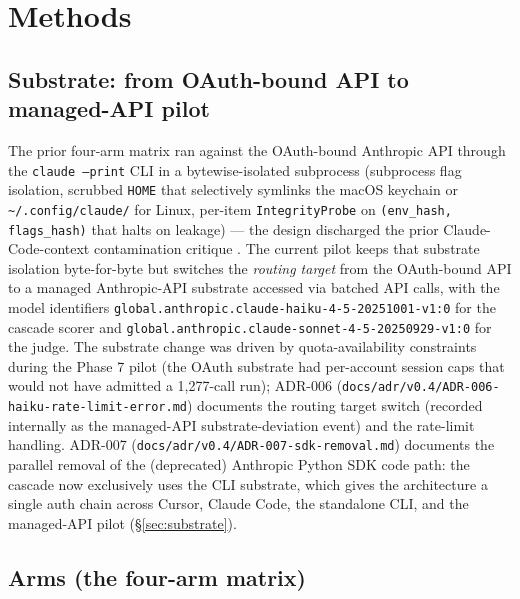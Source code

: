 \section{Methods}\label{sec:methods}

\sloppy

\subsection{Substrate: from OAuth-bound API to managed-API pilot}

The prior four-arm matrix ran against the OAuth-bound Anthropic API through the \texttt{claude --print} CLI in a bytewise-isolated subprocess (subprocess flag isolation, scrubbed \texttt{HOME} that selectively symlinks the macOS keychain or \texttt{\textasciitilde/.config/claude/} for Linux, per-item \texttt{IntegrityProbe} on \texttt{(env\_hash, flags\_hash)} that halts on leakage) --- the design discharged the prior Claude-Code-context contamination critique \citep{PratyakshaContextEng2025}. The current pilot keeps that substrate isolation byte-for-byte but switches the \emph{routing target} from the OAuth-bound API to a managed Anthropic-API substrate accessed via batched API calls, with the model identifiers \texttt{global.anthropic.claude-haiku-4-5-20251001-v1:0} for the cascade scorer and \texttt{global.anthropic.claude-sonnet-4-5-20250929-v1:0} for the judge. The substrate change was driven by quota-availability constraints during the Phase 7 pilot (the OAuth substrate had per-account session caps that would not have admitted a 1,277-call run); ADR-006 (\texttt{docs/adr/v0.4/ADR-006-haiku-rate-limit-error.md}) documents the routing target switch (recorded internally as the managed-API substrate-deviation event) and the rate-limit handling. ADR-007 (\texttt{docs/adr/v0.4/ADR-007-sdk-removal.md}) documents the parallel removal of the (deprecated) Anthropic Python SDK code path: the cascade now exclusively uses the CLI substrate, which gives the architecture a single auth chain across Cursor, Claude Code, the standalone CLI, and the managed-API pilot (\S\ref{sec:substrate}).

\subsection{Arms (the four-arm matrix)}

